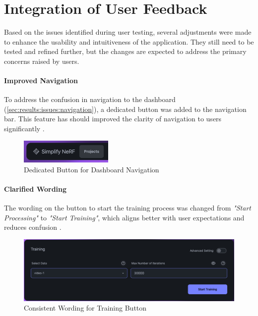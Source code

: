 \section{Integration of User Feedback}
\label{sec:discussion:user-feedback}

Based on the issues identified during user testing, several adjustments were made to enhance the usability and intuitiveness of the application.
They still need to be tested and refined further, but the changes are expected to address the primary concerns raised by users.

\paragraph{Improved Navigation}
To address the confusion in navigation to the dashboard (\ref{sec:results:issues:navigation}), a dedicated button was added to the navigation bar.
This feature has should improved the clarity of  navigation to users significantly .

\begin{figure}[htb]
  \centering
	\includegraphics[width=0.4\textwidth]{figures/fix-1.png}
	\caption{Dedicated Button for Dashboard Navigation}
  \label{fig:fix-1}
\end{figure}

\paragraph{Clarified Wording}
The wording on the button to start the training process was changed from \emph{"Start Processing"} to \emph{"Start Training"}, which aligns better with user expectations and reduces confusion .

\begin{figure}[htb]
  \centering
	\includegraphics[width=.7\textwidth]{figures/fix-2.png}
	\caption{Consistent Wording for Training Button}
  \label{fig:fix-2}
\end{figure}


